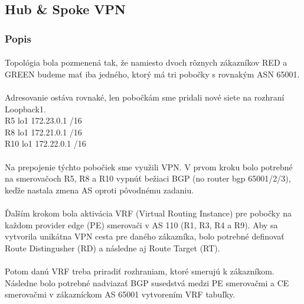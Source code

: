 \documentclass[12pt,twoside,a4paper]{report}
\begin{document}
\subsection{Hub \& Spoke VPN}
\subsubsection{Popis}
\paragraph{}
Topológia bola pozmenená tak, že namiesto dvoch rôznych zákazníkov RED a GREEN budeme mať iba jedného, ktorý má tri pobočky s rovnakým ASN 65001.

\paragraph{}
Adresovanie ostáva rovnaké, len pobočkám sme pridali nové siete na rozhraní Loopback1.\\
	R5	lo1	172.23.0.1 /16\\
	R8	lo1	172.21.0.1 /16\\
	R10	lo1	172.22.0.1 /16

\paragraph{}
Na prepojenie týchto pobočiek sme využili VPN. V prvom kroku bolo potrebné na smerovačoch R5, R8 a R10 vypnúť bežiaci BGP (no router bgp 65001/2/3), keďže nastala zmena AS oproti pôvodnému zadaniu.

\paragraph{}
Ďalším krokom bola aktivácia VRF (Virtual Routing Instance) pre pobočky na každom provider edge (PE) smerovači v AS 110 (R1, R3, R4 a R9). Aby sa vytvorila unikátna VPN cesta pre daného zákazníka, bolo potrebné definovať Route Distingusher (RD) a následne aj Route Target (RT).

\paragraph{}
Potom danú VRF treba priradiť rozhraniam, ktoré smerujú k zákazníkom. Následne bolo potrebné nadviazať BGP susedstvá medzi PE smerovačmi a CE smerovačmi v zákazníckom AS 65001 vytvorením VRF tabuľky.
\end{document}
